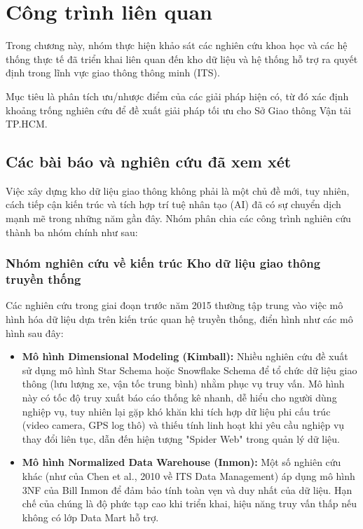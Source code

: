 \section{Công trình liên quan}
Trong chương này, nhóm thực hiện khảo sát các nghiên cứu khoa học và các hệ thống thực tế đã triển khai liên quan đến kho dữ liệu và hệ thống hỗ trợ ra quyết định trong lĩnh vực giao thông thông minh (ITS).

Mục tiêu là phân tích ưu/nhược điểm của các giải pháp hiện có, từ đó xác định khoảng trống nghiên cứu để đề xuất giải pháp tối ưu cho Sở Giao thông Vận tải TP.HCM.

\subsection{Các bài báo và nghiên cứu đã xem xét}

Việc xây dựng kho dữ liệu giao thông không phải là một chủ đề mới, tuy nhiên, cách tiếp cận kiến trúc và tích hợp trí tuệ nhân tạo (AI) đã có sự chuyển dịch mạnh mẽ trong những năm gần đây. Nhóm phân chia các công trình nghiên cứu thành ba nhóm chính như sau:

\subsubsection{Nhóm nghiên cứu về kiến trúc Kho dữ liệu giao thông truyền thống}

Các nghiên cứu trong giai đoạn trước năm 2015 thường tập trung vào việc mô hình hóa dữ liệu dựa trên kiến trúc quan hệ truyền thống, điển hình như các mô hình sau đây:

\begin{itemize}
    \item \textbf{Mô hình Dimensional Modeling (Kimball):} Nhiều nghiên cứu đề xuất sử dụng mô hình Star Schema hoặc Snowflake Schema để tổ chức dữ liệu giao thông (lưu lượng xe, vận tốc trung bình) nhằm phục vụ truy vấn. Mô hình này có tốc độ truy xuất báo cáo thống kê nhanh, dễ hiểu cho người dùng nghiệp vụ, tuy nhiên lại gặp khó khăn khi tích hợp dữ liệu phi cấu trúc (video camera, GPS log thô) và thiếu tính linh hoạt khi yêu cầu nghiệp vụ thay đổi liên tục, dẫn đến hiện tượng "Spider Web" trong quản lý dữ liệu.
    
    \item \textbf{Mô hình Normalized Data Warehouse (Inmon):} Một số nghiên cứu khác (như của Chen et al., 2010 về ITS Data Management) áp dụng mô hình 3NF của Bill Inmon để đảm bảo tính toàn vẹn và duy nhất của dữ liệu. Hạn chế của chúng là độ phức tạp cao khi triển khai, hiệu năng truy vấn thấp nếu không có lớp Data Mart hỗ trợ.
\end{itemize}

